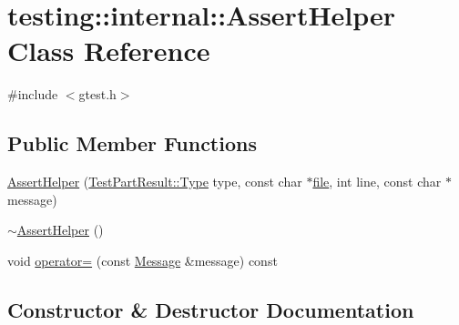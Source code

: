 \hypertarget{classtesting_1_1internal_1_1_assert_helper}{}\section{testing\+:\+:internal\+:\+:Assert\+Helper Class Reference}
\label{classtesting_1_1internal_1_1_assert_helper}


{\ttfamily \#include $<$gtest.\+h$>$}

\subsection*{Public Member Functions}
\begin{DoxyCompactItemize}
\item 
\hyperlink{classtesting_1_1internal_1_1_assert_helper_ac2c9334518fd4087189b4505567a3c90}{Assert\+Helper} (\hyperlink{classtesting_1_1_test_part_result_a65ae656b33fdfdfffaf34858778a52d5}{Test\+Part\+Result\+::\+Type} type, const char $\ast$\hyperlink{_07copy_08_2_read_camera_model_8m_a151631b2fd2bb776ef06c9f440a7ed74}{file}, int line, const char $\ast$message)
\item 
\hyperlink{classtesting_1_1internal_1_1_assert_helper_a51c640785d4ed4a0155cc9aa857d8931}{$\sim$\+Assert\+Helper} ()
\item 
void \hyperlink{classtesting_1_1internal_1_1_assert_helper_ab721be11cb9aca8a361ca1f014ca5f80}{operator=} (const \hyperlink{classtesting_1_1_message}{Message} \&message) const 
\end{DoxyCompactItemize}


\subsection{Constructor \& Destructor Documentation}
